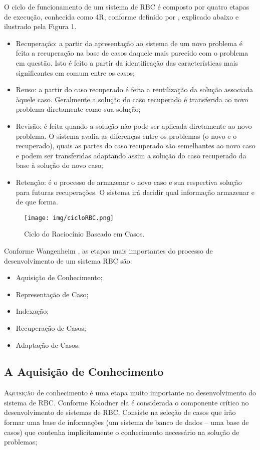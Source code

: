 O ciclo de funcionamento de um sistema de RBC é composto por quatro etapas de execução, conhecida como 4R, conforme definido por \cite{aamodt1994case}, explicado abaixo e ilustrado pela Figura 1.
\begin{itemize}
    \item Recuperação: a partir da apresentação ao sistema de um novo problema é feita a recuperação na base de casos daquele mais parecido com o problema em questão. Isto é feito a partir da identificação das características mais significantes em comum entre os casos;
    \item Reuso: a partir do caso recuperado é feita a reutilização da solução associada àquele caso. Geralmente a solução do caso recuperado é transferida ao novo problema diretamente como sua solução;
    \item Revisão: é feita quando a solução não pode ser aplicada diretamente ao novo problema. O sistema avalia as diferenças entre os problemas (o novo e o recuperado), quais as partes do caso recuperado são semelhantes ao novo caso e podem ser transferidas adaptando assim a solução do caso recuperado da base à solução do novo caso;
    \item Retenção: é o processo de armazenar o novo caso e sua respectiva solução para futuras recuperações. O sistema irá decidir qual informação armazenar e de que forma.
\end{itemize}

\begin{figure}[htbp!]
\centering
\texttt{[image: img/cicloRBC.png]}
\caption{Ciclo do Raciocínio Baseado em Casos.}
\label{fig:cicloRBC}
\end{figure}

Conforme Wangenheim \cite{WANGENHEIM2003}, as etapas mais importantes do processo de
desenvolvimento de um sistema RBC são:
\begin{itemize}
    \item Aquisição de Conhecimento;
    \item Representação de Caso;
    \item Indexação;
    \item Recuperação de Casos;
    \item Adaptação de Casos.
\end{itemize}

\subsection{A Aquisição de Conhecimento}
\lettrine{A}{quisição} de conhecimento é uma etapa muito importante no desenvolvimento do sistema de RBC. Conforme Kolodner \cite{Kolodner1993} ela é considerada o componente crítico no desenvolvimento de sistemas de RBC. Consiste na seleção de casos que irão formar uma base de informações (um sistema de banco de dados – uma base de casos) que contenha implicitamente o conhecimento necessário na solução de problemas;

